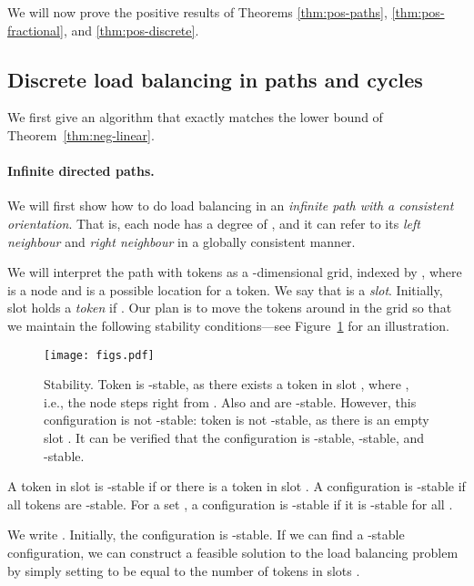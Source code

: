 

We will now prove the positive results of Theorems \ref{thm:pos-paths}, \ref{thm:pos-fractional}, and \ref{thm:pos-discrete}.

\subsection{Discrete load balancing in paths and cycles}
\label{ssec:pos-paths}

We first give an algorithm that exactly matches the lower bound of Theorem~\ref{thm:neg-linear}.

\thmpospaths*

\paragraph{Infinite directed paths.}

We will first show how to do load balancing in an \emph{infinite path with a consistent orientation}. That is, each node  has a degree of , and it can refer to its \emph{left neighbour}  and \emph{right neighbour}  in a globally consistent manner.

We will interpret the path with tokens as a -dimensional grid, indexed by , where  is a node and  is a possible location for a token. We say that  is a \emph{slot}. Initially, slot  holds a \emph{token} if . Our plan is to move the tokens around in the grid so that we maintain the following stability conditions---see Figure~\ref{fig:slots} for an illustration.

\begin{figure}[ht]
    \centering
    \texttt{[image: figs.pdf]}
    \caption{Stability. Token  is -stable, as there exists a token in slot , where , i.e., the node  steps right from . Also  and  are -stable. However, this configuration is not -stable: token  is not -stable, as there is an empty slot . It can be verified that the configuration is -stable, -stable, and -stable.}\label{fig:slots}
\end{figure}

\begin{definition}
    A token in slot  is -stable if  or there is a token in slot . A configuration is -stable if all tokens are -stable. For a set , a configuration is -stable if it is -stable for all .
\end{definition}

We write . Initially, the configuration is -stable. If we can find a -stable configuration, we can construct a feasible solution to the load balancing problem by simply setting  to be equal to the number of tokens in slots .

